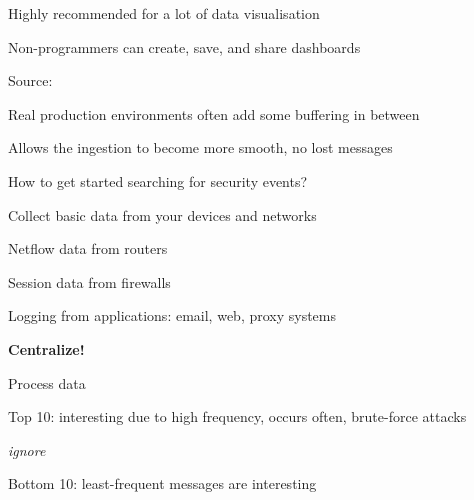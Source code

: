 \documentclass[Screen16to9,17pt]{foils}
\begin{document}


\centerline{Highly recommended for a lot of data visualisation}

Non-programmers can create, save, and share dashboards

Source:



\begin{list2}
\item Real production environments often add some buffering in between
\item Allows the ingestion to become more smooth, no lost messages
\end{list2}




\begin{list1}
\item How to get started searching for security events?
\item Collect basic data from your devices and networks
\begin{list2}
\item Netflow data from routers
\item Session data from firewalls
\item Logging from applications: email, web, proxy systems
\end{list2}
\item {\bf Centralize!}
\item Process data
\begin{list2}
\item Top 10: interesting due to high frequency, occurs often, brute-force attacks
\item {\it ignore}
\item Bottom 10: least-frequent messages are interesting
\end{list2}
\end{list1}




\end{document}
